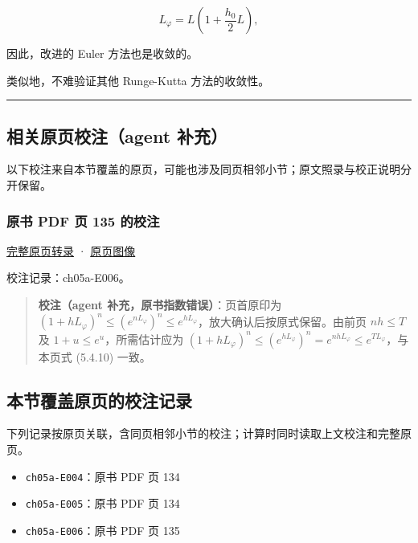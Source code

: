\documentclass[
  10pt,
  fontset=fandol]{ctexart}
\providecommand{\tightlist}{%
  \setlength{\itemsep}{0pt}\setlength{\parskip}{0pt}}
\begin{document}
\[
L_\varphi=L\left(1+\frac{h_0}{2}L\right),
\]

因此，改进的 Euler 方法也是收敛的。

类似地，不难验证其他 Runge-Kutta 方法的收敛性。

\begin{center}\rule{0.5\linewidth}{0.5pt}\end{center}

\subsection{相关原页校注（agent 补充）}\label{ux76f8ux5173ux539fux9875ux6821ux6ce8agent-ux8865ux5145}

以下校注来自本节覆盖的原页，可能也涉及同页相邻小节；原文照录与校正说明分开保留。

\subsubsection{原书 PDF 页 135 的校注}\label{ux539fux4e66-pdf-ux9875-135-ux7684ux6821ux6ce8}

\href{../pages/pdf-135.md}{完整原页转录} · \href{../../source-images/pdf-135.jpeg}{原页图像}

校注记录：ch05a-E006。

\begin{quote}
\textbf{校注（agent 补充，原书指数错误）}：页首原印为 \((1+hL_\varphi)^n\leqslant(e^{nL_\varphi})^n\leqslant e^{hL_\varphi}\)，放大确认后按原式保留。由前页 \(nh\leqslant T\) 及 \(1+u\leqslant e^u\)，所需估计应为 \((1+hL_\varphi)^n\leqslant(e^{hL_\varphi})^n=e^{nhL_\varphi}\leqslant e^{TL_\varphi}\)，与本页式 (5.4.10) 一致。
\end{quote}

\subsection{本节覆盖原页的校注记录}\label{ux672cux8282ux8986ux76d6ux539fux9875ux7684ux6821ux6ce8ux8bb0ux5f55}

下列记录按原页关联，含同页相邻小节的校注；计算时同时读取上文校注和完整原页。

\begin{itemize}
\tightlist
\item
  \texttt{ch05a-E004}：原书 PDF 页 134
\item
  \texttt{ch05a-E005}：原书 PDF 页 134
\item
  \texttt{ch05a-E006}：原书 PDF 页 135
\end{itemize}
\end{document}
